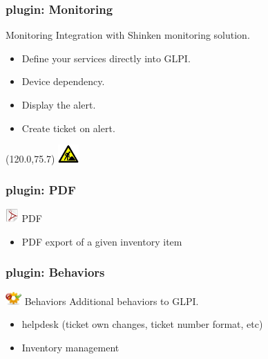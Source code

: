\documentclass{beamer}
\newcommand{\WorkInProgress}{%
\begin{textblock}{14}(120.0,75.7)
\includegraphics[height=0.7cm]{./pics/workinprogress.jpg}
\end{textblock}
  }
\begin{document}
\begin{frame}
    \frametitle{plugin: Monitoring}
    
    \begin{block}{Monitoring}
        Integration with Shinken monitoring solution.
        \begin{itemize}
            \item Define your services directly into GLPI.
            \item Device dependency.
            \item Display the alert.
            \item Create ticket on alert.
        \end{itemize}
    \end{block}
\WorkInProgress
\end{frame}

\begin{frame}
    \frametitle{plugin: PDF}
    
    \begin{block}{\includegraphics[height=0.5cm]{./pics/plugins/pdf.jpg} PDF}
        \begin{itemize}
            \item PDF export of a given inventory item
        \end{itemize}
    \end{block}

\end{frame}

\begin{frame}
    \frametitle{plugin: Behaviors}
    
    \begin{block}{\includegraphics[height=0.5cm]{./pics/plugins/behaviors.jpg} Behaviors}
        Additional behaviors to GLPI.
        \begin{itemize}
            \item helpdesk (ticket own changes, ticket number format, etc)
            \item Inventory management
        \end{itemize}
    \end{block}

\end{frame}
\end{document}
